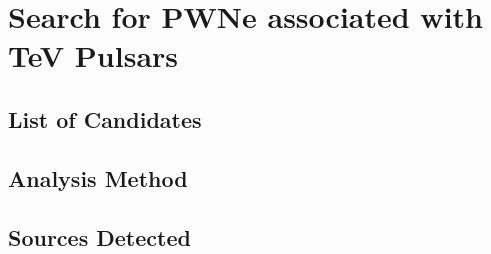 
\chapter{Search for PWNe associated with TeV Pulsars}

\section{List of Candidates}

\section{Analysis Method}

\section{Sources Detected}
